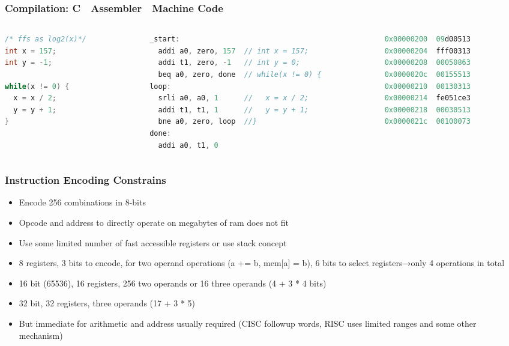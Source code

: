 \documentclass{beamer}
\begin{document}
\begin{frame}[fragile]
\frametitle{Compilation: C  Assembler  Machine Code}

\begin{columns}
\begin{column}{0.3\textwidth}
\begin{lstlisting}[language={C},columns=flexible]
/* ffs as log2(x)*/
int x = 157;
int y = -1;
 
while(x != 0) {
  x = x / 2;
  y = y + 1;
}
\end{lstlisting}
\end{column}

\begin{column}{0.4\textwidth}  
\begin{lstlisting}[language={C},columns=flexible]
_start:
  addi a0, zero, 157  // int x = 157;
  addi t1, zero, -1   // int y = 0;
  beq a0, zero, done  // while(x != 0) {
loop:
  srli a0, a0, 1      //   x = x / 2;
  addi t1, t1, 1      //   y = y + 1;
  bne a0, zero, loop  //}
done:
  addi a0, t1, 0
\end{lstlisting}
\end{column}

\begin{column}{0.3\textwidth}  
\begin{lstlisting}[language={C},columns=flexible]
0x00000200  09d00513
0x00000204  fff00313
0x00000208  00050863
0x0000020c  00155513
0x00000210  00130313
0x00000214  fe051ce3
0x00000218  00030513
0x0000021c  00100073
\end{lstlisting}
\end{column}

\end{columns}

\end{frame}


\begin{frame}
\frametitle{Instruction Encoding Constrains}
\begin{itemize}
\item Encode 256 combinations in 8-bits
\item Opcode and address to directly operate on megabytes of ram does not fit
\item Use some limited number of fast accessible registers or use stack concept
\item 8 registers, 3 bits to encode, for two operand operations (a += b, mem[a] = b), 6 bits to select registers→only 4 operations in total
\item 16 bit (65536), 16 registers, 256 two operands or 16 three operands (4 + 3 * 4 bits)
\item 32 bit, 32 registers, three operands (17 + 3 * 5)
\item But immediate for arithmetic and address usually required (CISC followup words, RISC uses limited ranges and some other mechanism) 
\end{itemize}
\end{frame}
\end{document}
